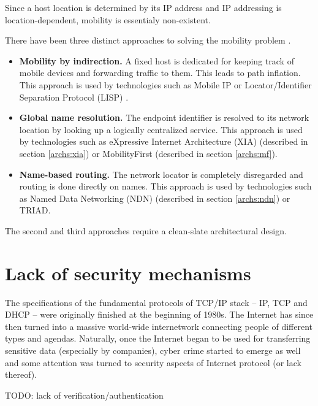         Since a host location is determined by its IP address and IP addressing is location-dependent, mobility is essentialy non-existent.

        There have been three distinct approaches to solving the mobility problem \cite{MobilityFirst}.

        \begin{itemize}
            \item \textbf{Mobility by indirection.} A fixed host is dedicated for keeping track of mobile devices and forwarding traffic to them. This leads to path inflation.
            This approach is used by technologies such as Mobile IP \cite{rfc5944} or Locator/Identifier Separation Protocol (LISP) \cite{rfc6830}.
            \item \textbf{Global name resolution.} The endpoint identifier is resolved to its network location by looking up a logically centralized service.
            This approach is used by technologies such as eXpressive Internet Architecture (XIA) \cite{xia} (described in section \ref{archs:xia}) or MobilityFirst \cite{MobilityFirst} (described in section \ref{archs:mf}).
            \item \textbf{Name-based routing.} The network locator is completely disregarded and routing is done directly on names.
            This approach is used by technologies such as Named Data Networking (NDN) \cite{ndn} (described in section \ref{archs:ndn}) or TRIAD.
        \end{itemize}

        The second and third approaches require a clean-slate architectural design.

    \section{Lack of security mechanisms}

        The specifications of the fundamental protocols of TCP/IP stack -- IP, TCP and DHCP -- were originally finished at the beginning of 1980s. The Internet has since then turned into a massive world-wide internetwork connecting people of different types and agendas. Naturally, once the Internet began to be used for transferring sensitive data (especially by companies), cyber crime started to emerge as well and some attention was turned to security aspects of Internet protocol (or lack thereof).

        TODO: lack of verification/authentication

